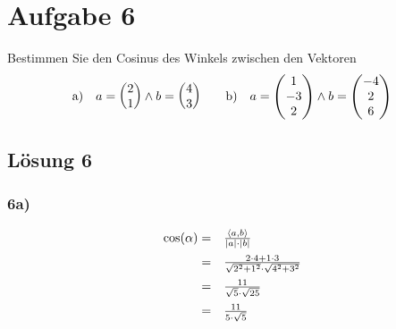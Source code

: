 \section*{Aufgabe 6}

Bestimmen Sie den Cosinus des Winkels zwischen den Vektoren
\begin{align*}
  \begin{array}{ c c }
    \text{a)} & a=\begin{pmatrix}
      2\\
      1
    \end{pmatrix} \land b=\begin{pmatrix}
      4\\
      3
    \end{pmatrix}
  \end{array} & & \begin{array}{ c c }
    \text{b)} & a=\begin{pmatrix}
      1\\
      -3\\
      2
    \end{pmatrix} \land b=\begin{pmatrix}
      -4\\
      2\\
      6
    \end{pmatrix}
  \end{array}
\end{align*}

\subsection*{Lösung 6}
\subsubsection*{6a)}
\begin{equation*}
  \begin{array}{ r l }
    \cos( \alpha ) = & \frac{\langle a,b\rangle }{|a|\cdot |b|}\vspace{2mm}\\
    = & \frac{2\cdot 4+1\cdot 3}{\sqrt{2^{2} +1^{2}} \cdot \sqrt{4^{2} +3^{2}}}\vspace{2mm}\\
    = & \frac{11}{\sqrt{5} \cdot \sqrt{25}}\vspace{2mm}\\
    = & \frac{11}{5\cdot \sqrt{5}}
  \end{array}
\end{equation*}

